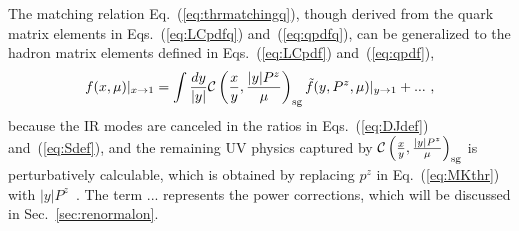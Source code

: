 \documentclass[a4paper,11pt]{article}
\begin{document}
The matching relation Eq.~(\ref{eq:thrmatchingq}), though derived from the quark matrix elements in Eqs.~(\ref{eq:LCpdfq}) and~(\ref{eq:qpdfq}), can be generalized to the hadron matrix elements defined in Eqs.~(\ref{eq:LCpdf}) and~(\ref{eq:qpdf}),
\begin{align}\label{eq:thrmatching}
f(x,\mu) |_{x \rightarrow 1} =  \int \frac{d y}{|y|} \mathcal{C}\left(\frac{x}{y},\frac{|y|P^z}{\mu}\right)_{\rm sg} \tilde f(y,P^z,\mu) |_{y \rightarrow 1} + ... \ ,
\end{align}   
because the IR modes are canceled in the ratios in Eqs.~(\ref{eq:DJdef}) and~(\ref{eq:Sdef}), and the remaining UV physics captured by $\mathcal{C}\left(\frac{x}{y},\frac{|y|P^z}{\mu}\right)_{\rm sg}$ is perturbatively calculable, which is obtained by replacing $p^z$ in Eq.~(\ref{eq:MKthr}) with $|y|P^z$~\cite{Izubuchi:2018srq}. The term $...$ represents the power corrections, which will be discussed in Sec.~\ref{sec:renormalon}.
\end{document}
